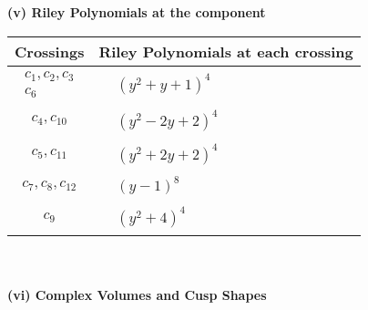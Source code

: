 \documentclass[1p]{elsarticle_modified}
\theoremstyle{definition}
\begin{document}
\newpage\renewcommand{\arraystretch}{1}
\flushleft \textbf{(v) Riley Polynomials at the component}\newline \\
\begin{tabular}{m{50pt}|m{274pt}}
Crossings & \hspace{64pt}Riley Polynomials at each crossing \\
\hline $$\begin{aligned}c_{1},c_{2},c_{3}\\c_{6}\end{aligned}$$&$\begin{aligned}
&(y^2+y+1)^4
\end{aligned}$\\
\hline $$\begin{aligned}c_{4},c_{10}\end{aligned}$$&$\begin{aligned}
&(y^2-2 y+2)^4
\end{aligned}$\\
\hline $$\begin{aligned}c_{5},c_{11}\end{aligned}$$&$\begin{aligned}
&(y^2+2 y+2)^4
\end{aligned}$\\
\hline $$\begin{aligned}c_{7},c_{8},c_{12}\end{aligned}$$&$\begin{aligned}
&(y-1)^8
\end{aligned}$\\
\hline $$\begin{aligned}c_{9}\end{aligned}$$&$\begin{aligned}
&(y^2+4)^4
\end{aligned}$\\
\hline
\end{tabular}\\~\\
\newpage\flushleft \textbf{(vi) Complex Volumes and Cusp Shapes}
\end{document}
